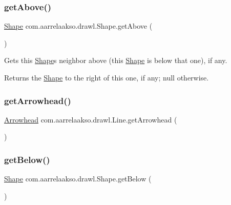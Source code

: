 \subsubsection{\texorpdfstring{get\+Above()}{getAbove()}}
{\footnotesize\ttfamily \hyperlink{classcom_1_1aarrelaakso_1_1drawl_1_1_shape}{Shape} com.\+aarrelaakso.\+drawl.\+Shape.\+get\+Above (\begin{DoxyParamCaption}{ }\end{DoxyParamCaption})\hspace{0.3cm}{\ttfamily [inherited]}}



Gets this \hyperlink{classcom_1_1aarrelaakso_1_1drawl_1_1_shape}{Shape}\textquotesingle{}s neighbor above (this \hyperlink{classcom_1_1aarrelaakso_1_1drawl_1_1_shape}{Shape} is below that one), if any. 

\begin{DoxyReturn}{Returns}
the \hyperlink{classcom_1_1aarrelaakso_1_1drawl_1_1_shape}{Shape} to the right of this one, if any; {\ttfamily null} otherwise. 
\end{DoxyReturn}
\mbox{\label{classcom_1_1aarrelaakso_1_1drawl_1_1_line_a9659e69575b1fd2bd2f6dbfc7e11521b}} 
\subsubsection{\texorpdfstring{get\+Arrowhead()}{getArrowhead()}}
{\footnotesize\ttfamily \hyperlink{classcom_1_1aarrelaakso_1_1drawl_1_1_arrowhead}{Arrowhead} com.\+aarrelaakso.\+drawl.\+Line.\+get\+Arrowhead (\begin{DoxyParamCaption}{ }\end{DoxyParamCaption})}

\mbox{\label{classcom_1_1aarrelaakso_1_1drawl_1_1_shape_a53de5ab609d879719cd3b372dfe8df58}} 
\subsubsection{\texorpdfstring{get\+Below()}{getBelow()}}
{\footnotesize\ttfamily \hyperlink{classcom_1_1aarrelaakso_1_1drawl_1_1_shape}{Shape} com.\+aarrelaakso.\+drawl.\+Shape.\+get\+Below (\begin{DoxyParamCaption}{ }\end{DoxyParamCaption})\hspace{0.3cm}{\ttfamily [inherited]}}



